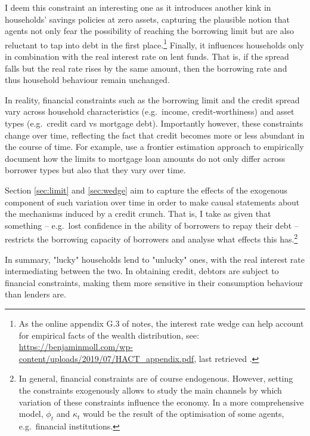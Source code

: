 \documentclass[a4paper,12pt]{article} %
\numberwithin{equation}{section} %
\numberwithin{figure}{section}
\numberwithin{table}{section}
\begin{document}
I deem this constraint an interesting one as it introduces another kink in households' savings policies at zero assets, capturing the plausible notion that agents not only fear the possibility of reaching the borrowing limit but are also reluctant to tap into debt in the first place.\footnote{As the online appendix G.3 of \textcite{achdou2022} notes, the interest rate wedge can help account for empirical facts of the wealth distribution, see: \url{https://benjaminmoll.com/wp-content/uploads/2019/07/HACT_appendix.pdf}, last retrieved .} Finally, it influences households only in combination with the real interest rate on lent funds. That is, if the spread falls but the real rate rises by the same amount, then the borrowing rate and thus household behaviour remain unchanged.

In reality, financial constraints such as the borrowing limit and the credit spread vary across household characteristics (e.g.~income, credit-worthiness) and asset types (e.g.~credit card vs mortgage debt). Importantly however, these constraints change over time, reflecting the fact that credit becomes more or less abundant in the course of time. For example, \textcite{anenberg2018} use a frontier estimation approach to empirically document how the limits to mortgage loan amounts do not only differ across borrower types but also that they vary over time.

Section \ref{sec:limit} and \ref{sec:wedge} aim to capture the effects of the exogenous component of such variation over time in order to make causal statements about the mechanisms induced by a credit crunch. That is, I take as given that something -- e.g.~lost confidence in the ability of borrowers to repay their debt -- restricts the borrowing capacity of borrowers and analyse what effects this has.\footnote{In general, financial constraints are of course endogenous. However, setting the constraints exogenously allows to study the main channels by which variation of these constraints influence the economy. In a more comprehensive model, $\phi_t$ and $\kappa_t$ would be the result of the optimisation of some agents, e.g.~financial institutions.}

In summary, "lucky" households lend to "unlucky" ones, with the real interest rate intermediating between the two. In obtaining credit, debtors are subject to financial constraints, making them more sensitive in their consumption behaviour than lenders are.

\end{document}
